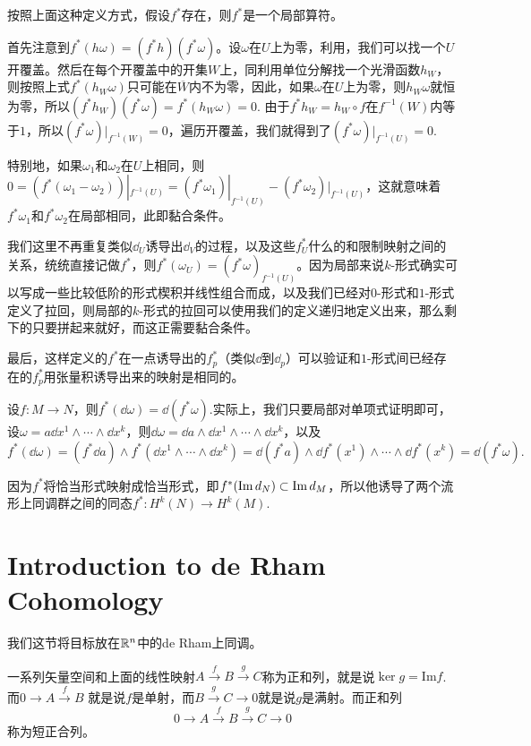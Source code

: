 \para 按照上面这种定义方式，假设$f^*$存在，则$f^*$是一个局部算符。

首先注意到$f^*(h\omega)=(f^*h)(f^*\omega)$。设$\omega$在$U$上为零，利用，我们可以找一个$U$开覆盖。然后在每个开覆盖中的开集$W$上，同利用单位分解找一个光滑函数$h_W$，则按照上式$f^*(h_W\omega)$只可能在$\overline{W}$内不为零，因此，如果$\omega$在$U$上为零，则$h_W\omega$就恒为零，所以$(f^*h_W)(f^*\omega)=f^*(h_W\omega)=0$. 由于$f^*h_W=h_W\circ f$在$f^{-1}(W)$内等于$1$，所以$(f^*\omega)|_{f^{-1}(W)}=0$，遍历开覆盖，我们就得到了$(f^*\omega)|_{f^{-1}(U)}=0$.

特别地，如果$\omega_1$和$\omega_2$在$U$上相同，则$0=(f^*(\omega_1-\omega_2))|_{f^{-1}(U)}=(f^*\omega_1)|_{f^{-1}(U)}-(f^*\omega_2)|_{f^{-1}(U)}$，这就意味着$f^*\omega_1$和$f^*\omega_2$在局部相同，此即黏合条件。

我们这里不再重复类似$\dd_U$诱导出$\dd_V$的过程，以及这些$f^*_U$什么的和限制映射之间的关系，统统直接记做$f^*$，则$f^*(\omega_{U})=(f^* \omega)_{f^{-1}(U)}$。因为局部来说$k$-形式确实可以写成一些比较低阶的形式楔积并线性组合而成，以及我们已经对$0$-形式和$1$-形式定义了拉回，则局部的$k$-形式的拉回可以使用我们的定义递归地定义出来，那么剩下的只要拼起来就好，而这正需要黏合条件。

最后，这样定义的$f^*$在一点诱导出的$f^*_p$（类似$\dd$到$\dd_p$）可以验证和$1$-形式间已经存在的$f^*_p$用张量积诱导出来的映射是相同的。

\para 设$f:M\to N$，则$f^*(\dd \omega)=\dd (f^*\omega)$.实际上，我们只要局部对单项式证明即可，设$\omega=a\dd x^{1}\wedge\cdots\wedge \dd x^{k}$，则$\dd \omega=\dd a\wedge \dd x^{1}\wedge\cdots\wedge \dd x^{k}$，以及
\[
	f^*(\dd \omega)=(f^*\dd a)\wedge f^*(\dd x^{1}\wedge\cdots\wedge \dd x^{k})=\dd (f^*a)\wedge \dd f^*(x^{1})\wedge\cdots\wedge \dd f^*(x^{k})=\dd (f^*\omega).
\]

因为$f^*$将恰当形式映射成恰当形式，即$f^*(\operatorname{Im} d_N)\subset \operatorname{Im} d_M$，所以他诱导了两个流形上同调群之间的同态$f^*:H^k(N)\to H^k(M)$.

\section{Introduction to de Rham Cohomology}

我们这节将目标放在$\mathbb{R}^n$中的de Rham上同调。

\para 一系列矢量空间和上面的线性映射$A\xrightarrow{f}B\xrightarrow{g}C$称为正和列，就是说$\ker g=\mathrm{Im} f$.而$0\to A\xrightarrow{f}B$
就是说$f$是单射，而$B\xrightarrow{g}C\to 0$就是说$g$是满射。而正和列
\[
0\to A\xrightarrow{f}B\xrightarrow{g}C\to 0
\]
称为短正合列。

